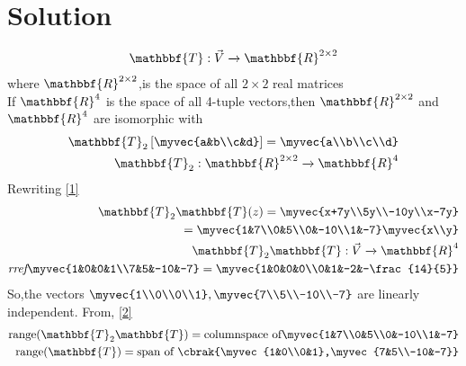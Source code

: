 \documentclass[journal,12pt,twocolumn]{IEEEtran}
\begin{document}
\section{Solution}
\begin{align}
    \mathbbf{T}:\vec{V}\xrightarrow{}\mathbbf{R}^{2 \times 2}
\end{align}
where $\mathbbf{R}^{2 \times 2}$,is the space of all $2 \times 2$ real matrices\\
If $\mathbbf{R}^4$ is the space of all 4-tuple vectors,then $\mathbbf{R}^{2 \times 2}$ and $\mathbbf{R}^4$ are isomorphic with 
\begin{align}
    \mathbbf{T}_2\left[\myvec{a&b\\c&d}\right ]= \myvec{a\\b\\c\\d}\\
    \mathbbf{T}_2:\mathbbf{R}^{2 \times 2}\xrightarrow{}\mathbbf{R}^4
\end{align}
Rewriting \eqref{1}
\begin{align}
     \mathbbf{T}_2\mathbbf{T}(z)=\myvec{x+7y\\5y\\-10y\\x-7y}\\
     =\myvec{1&7\\0&5\\0&-10\\1&-7}\myvec{x\\y}\label{2}\\
     \mathbbf{T}_2\mathbbf{T}:\vec{V}\xrightarrow{}\mathbbf{R}^4\\
     \textit{rref}\myvec{1&0&0&1\\7&5&-10&-7}=\myvec{1&0&0&0\\0&1&-2&-\frac{14}{5}}
\end{align} 
So,the vectors $\myvec{1\\0\\0\\1},\myvec{7\\5\\-10\\-7}$ are linearly independent.
From, \eqref{2}
\begin{align}
    \text{range} (\mathbbf{T}_2\mathbbf{T})=\text{columnspace of}\myvec{1&7\\0&5\\0&-10\\1&-7}\\
  \text{ range}(\mathbbf{T}) = \text{span of }\cbrak{\myvec{1&0\\0&1},\myvec{7&5\\-10&-7}} 
\end{align}
\end{document}
